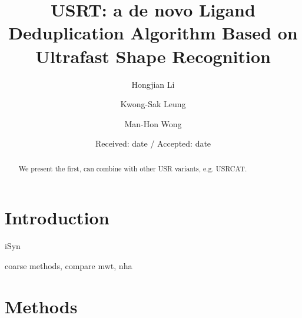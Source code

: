 \documentclass[twocolumn]{svjour3}          %
\begin{document}
\title{USRT: a de novo Ligand Deduplication Algorithm Based on Ultrafast Shape Recognition
}


\author{Hongjian Li \and Kwong-Sak Leung \and Man-Hon Wong
}



\date{Received: date / Accepted: date}

\maketitle

\begin{abstract}

We present the first,
can combine with other USR variants, e.g. USRCAT.

\end{abstract}

\section{Introduction}
\label{intro}

iSyn \cite{}

coarse methods, compare mwt, nha

\section{Methods}
\label{sec:methods}
\end{document}

